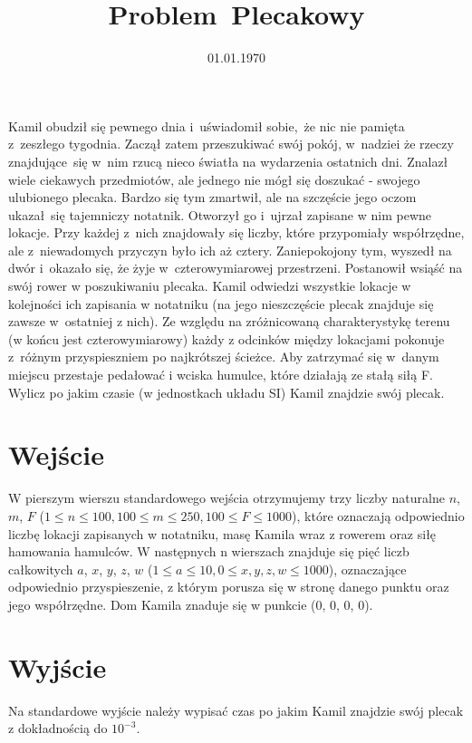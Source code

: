 \documentclass[zad]{soigstyl}
\date{01.01.1970}
\title{\mbox{Problem Plecakowy}}
\begin{document}
\begin{tasktext}%
    \noindent
    Kamil obudził się pewnego dnia i~uświadomił sobie,~że nic nie pamięta z~zeszłego tygodnia. Zaczął zatem przeszukiwać swój pokój, w~nadziei że rzeczy znajdujące~się w~nim rzucą nieco światła na wydarzenia ostatnich dni. Znalazł wiele ciekawych przedmiotów, ale jednego nie mógł się doszukać - swojego ulubionego plecaka. Bardzo się tym zmartwił, ale na szczęście jego oczom ukazał~się tajemniczy notatnik. Otworzył go i~ujrzał zapisane w nim pewne lokacje.  Przy każdej z~nich znajdowały się liczby, które przypomiały współrzędne, ale z~niewadomych przyczyn było ich aż cztery. Zaniepokojony tym, wyszedł na dwór i~okazało się, że żyje w~czterowymiarowej przestrzeni. Postanowił wsiąść na swój rower w poszukiwaniu plecaka. Kamil odwiedzi wszystkie lokacje w kolejności ich zapisania w notatniku (na jego nieszczęście plecak znajduje się zawsze w~ostatniej z nich). Ze względu na zróżnicowaną charakterystykę terenu (w końcu jest czterowymiarowy) każdy z odcinków między lokacjami pokonuje z~różnym przyspieszniem po najkrótszej ścieżce. Aby zatrzymać się w~danym miejscu przestaje pedałować i wciska humulce, które działają ze stałą siłą F. Wylicz po jakim czasie (w jednostkach układu SI) Kamil znajdzie swój plecak.
	
    	\section{Wejście}
	W pierszym wierszu standardowego wejścia otrzymujemy trzy liczby naturalne $n$, $m$, $F$ ($1\leqslant n\leqslant 100, 100\leqslant m\leqslant 250,  100\leqslant F\leqslant 1000$), które oznaczają odpowiednio liczbę lokacji zapisanych w notatniku, masę Kamila wraz z rowerem oraz siłę hamowania hamulców. W następnych n wierszach znajduje się pięć liczb całkowitych $a$, $x$, $y$, $z$, $w$ ($1\leqslant a\leqslant 10, 0\leqslant x, y, z, w\leqslant 1000$), oznaczające odpowiednio przyspieszenie, z którym porusza się w stronę danego punktu oraz jego współrzędne. Dom Kamila znaduje się w punkcie (0, 0, 0, 0). 

	\section{Wyjście}
	Na standardowe wyjście należy wypisać czas po jakim Kamil znajdzie swój plecak z dokładnością do $10^{-3}$.
	
	\oigprzyklady
\end{tasktext}
\end{document}
